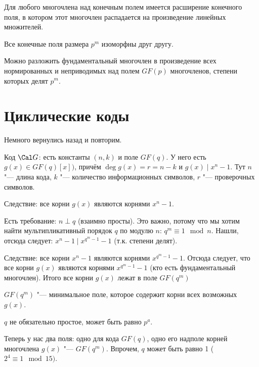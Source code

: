 \begin{theorem}
	Для любого многочлена над конечным полем имеется расширение конечного поля,
	в котором этот многочлен распадается на произведение линейных множителей.
\end{theorem}

\begin{theorem}
	Все конечные поля размера $p^m$ изоморфны друг другу.
\end{theorem}

\begin{theorem}
	Можно разложить фундаментальный многочлен в произведение
	всех нормированных и неприводимых над полем $GF(p)$ многочленов,
	степени которых делят $p^m$.
\end{theorem}

\section{Циклические коды}
Немного вернулись назад и повторим.

Код $\Cal G$: есть константы $(n, k)$ и поле $GF(q)$.
У него есть $g(x) \in GF(q)[x])$,
причём $\deg g(x) = r = n - k$ и $g(x) \mid x^n - 1$.
Тут $n$ "--- длина кода, $k$ "--- количество информационных символов,
$r$ "--- проверочных символов.

Следствие: все корни $g(x)$ являются корнями $x^n-1$.

Есть требование: $n \perp q$ (взаимно просты).
Это важно, потому что мы хотим найти мультипликативный
порядок $q$ по модулю $n$: $q^m \equiv 1 \mod n$.
Нашли, отсюда следует: $x^n-1 \mid x^{q^m-1}-1$ (т.к. степени делят).

Следствие: все корни $x^n-1$ являются корнями $x^{q^m-1}-1$.
Отсюда следует, что все корни $g(x)$ являются корнями  $x^{q^m-1}-1$ (кто есть фундаментальный многочлен).
Итого все корни $g(x)$ лежат в поле $GF(q^m)$
\begin{lemma}
$GF(q^m)$ "--- минимальное поле, которое содержит корни всех возможных $g(x)$.
\end{lemma}
\begin{Rem}
$q$ не обязательно простое, может быть равно $p^a$.
\end{Rem}

\begin{Rem}
	Теперь у нас два поля: одно для кода $GF(q)$, одно его надполе
	корней многочлена $g(x)$ "--- $GF(q^m)$.
	Впрочем, $q$ может быть равно 1 ($2^4\equiv 1 \mod 15)$.
\end{Rem}

